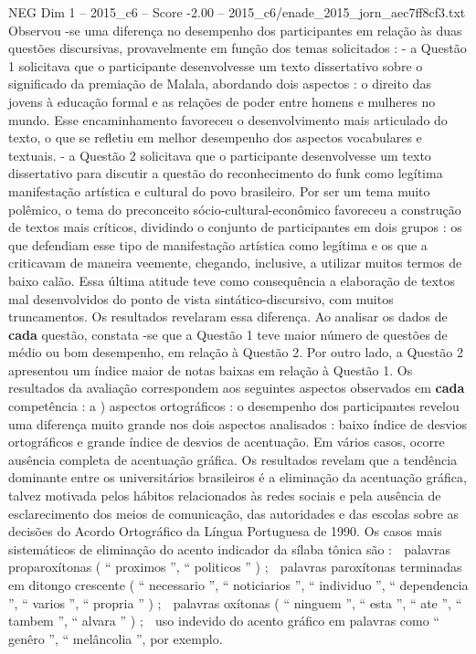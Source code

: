 \begin{textsample}{NEG Dim 1 – 2015\_c6 – Score -2.00 – 2015\_c6/enade\_2015\_jorn\_aec7ff8cf3.txt}
Observou -se uma diferença no desempenho dos participantes em relação às duas questões discursivas, provavelmente em função dos temas solicitados : - a Questão 1 solicitava que o participante desenvolvesse um texto dissertativo sobre o significado da premiação de Malala, abordando dois aspectos : o direito das jovens à educação formal e as relações de poder entre homens e mulheres no mundo.
Esse encaminhamento favoreceu o desenvolvimento mais articulado do texto, o que se refletiu em melhor desempenho dos aspectos vocabulares e textuais. - a Questão 2 solicitava que o participante desenvolvesse um texto dissertativo para discutir a questão do reconhecimento do funk como legítima manifestação artística e cultural do povo brasileiro.
Por ser um tema muito polêmico, o tema do preconceito sócio-cultural-econômico favoreceu a construção de textos mais críticos, dividindo o conjunto de participantes em dois grupos : os que defendiam esse tipo de manifestação artística como legítima e os que a criticavam de maneira veemente, chegando, inclusive, a utilizar muitos termos de baixo calão.
Essa última atitude teve como consequência a elaboração de textos mal desenvolvidos do ponto de vista sintático-discursivo, com muitos truncamentos.
Os resultados revelaram essa diferença.
Ao analisar os dados de \textbf{cada} questão, constata -se que a Questão 1 teve maior número de questões de médio ou bom desempenho, em relação à Questão 2.
Por outro lado, a Questão 2 apresentou um índice maior de notas baixas em relação à Questão 1.
Os resultados da avaliação correspondem aos seguintes aspectos observados em \textbf{cada} competência : a ) aspectos ortográficos : o desempenho dos participantes revelou uma diferença muito grande nos dois aspectos analisados : baixo índice de desvios ortográficos e grande índice de desvios de acentuação.
Em vários casos, ocorre ausência completa de acentuação gráfica.
Os resultados revelam que a tendência dominante entre os universitários brasileiros é a eliminação da acentuação gráfica, talvez motivada pelos hábitos relacionados às redes sociais e pela ausência de esclarecimento dos meios de comunicação, das autoridades e das escolas sobre as decisões do Acordo Ortográfico da Língua Portuguesa de 1990.
Os casos mais sistemáticos de eliminação do acento indicador da sílaba tônica são :  palavras proparoxítonas ( “ proximos ”, “ politicos ” ) ;  palavras paroxítonas terminadas em ditongo crescente ( “ necessario ”, “ noticiarios ”, “ individuo ”, “ dependencia ”, “ varios ”, “ propria ” ) ;  palavras oxítonas ( “ ninguem ”, “ esta ”, “ ate ”, “ tambem ”, “ alvara ” ) ;  uso indevido do acento gráfico em palavras como “ genêro ”, “ melâncolia ”, por exemplo.

\end{textsample}
